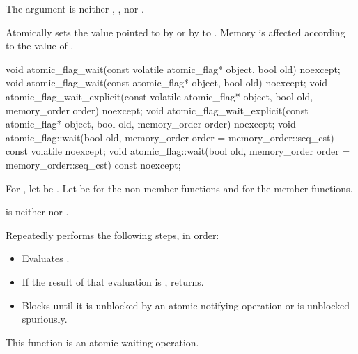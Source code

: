 \begin{itemdescr}
\pnum
\expects
The  argument is neither ,
, nor .

\pnum
\effects
Atomically sets the value pointed to by  or by  to
. Memory is affected according to the value of .
\end{itemdescr}

%
%
%
\begin{itemdecl}
void atomic_flag_wait(const volatile atomic_flag* object, bool old) noexcept;
void atomic_flag_wait(const atomic_flag* object, bool old) noexcept;
void atomic_flag_wait_explicit(const volatile atomic_flag* object,
                               bool old, memory_order order) noexcept;
void atomic_flag_wait_explicit(const atomic_flag* object,
                               bool old, memory_order order) noexcept;
void atomic_flag::wait(bool old, memory_order order =
                                   memory_order::seq_cst) const volatile noexcept;
void atomic_flag::wait(bool old, memory_order order =
                                   memory_order::seq_cst) const noexcept;
\end{itemdecl}

\begin{itemdescr}
\pnum
For ,
let  be .
Let  be  for the non-member functions and
 for the member functions.

\pnum
\expects
{} is
neither  nor .

\pnum
\effects
Repeatedly performs the following steps, in order:
\begin{itemize}
\item
  Evaluates .
\item
  If the result of that evaluation is , returns.
\item
  Blocks until it
  is unblocked by an atomic notifying operation or is unblocked spuriously.
\end{itemize}

\pnum
\remarks
This function is an atomic waiting operation.
\end{itemdescr}

